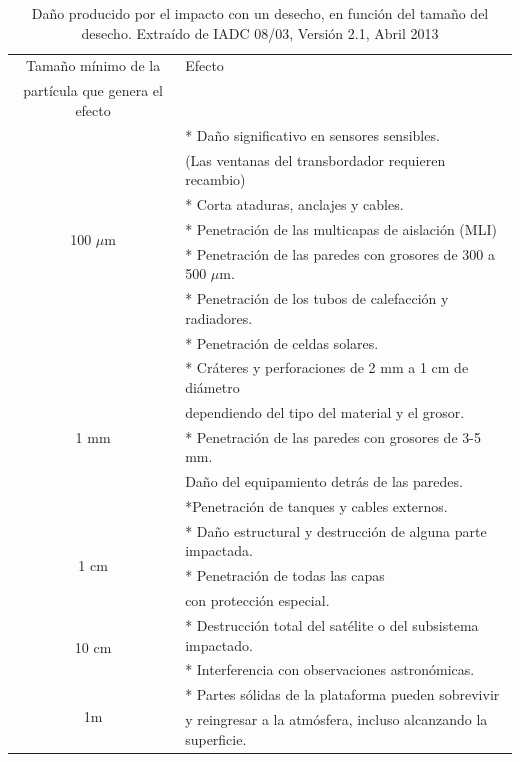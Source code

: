  \begin{table}[h]
\centering
\begin{tabular}[c]{|c l|}
\hline
\hline
Tama\~no m\'inimo de la  &    Efecto\\
part\'icula que genera el efecto & \\
\hline
\hline
\multirow{ 7}{*}{100 $\mu$m }& * Da\~no significativo en sensores sensibles.\\
& (Las ventanas del transbordador requieren recambio)\\
& * Corta ataduras, anclajes y cables.\\
& * Penetraci\'on de las multicapas de aislaci\'on (MLI)\\
& * Penetraci\'on de las paredes con grosores de 300 a 500 $\mu$m.\\
& * Penetraci\'on de los tubos de calefacci\'on y radiadores.\\
& * Penetraci\'on de celdas solares.\\
\hline 
\multirow{ 5}{*}{1 mm }& * Cr\'ateres y perforaciones de 2 mm a 1 cm de di\'ametro\\
& dependiendo del tipo del material y el grosor.\\
& * Penetraci\'on de las paredes con grosores de 3-5 mm.\\
& Da\~no del equipamiento detr\'as de las paredes.\\
& *Penetraci\'on de tanques y cables externos.\\
\hline
\multirow{ 3}{*}{1 cm } & * Da\~no estructural y destrucci\'on de alguna parte impactada.\\
& * Penetraci\'on de todas las capas\\ %
& con protecci\'on especial.\\
\hline
\multirow{ 2}{*}{10 cm } & * Destrucci\'on total del sat\'elite o del subsistema impactado.\\
& * Interferencia con observaciones astron\'omicas.\\
\hline
\multirow{ 2}{*}{1m}& * Partes s\'olidas de la plataforma pueden sobrevivir\\
& y reingresar a la atmósfera, incluso alcanzando la superficie.\\
\hline
\end{tabular}
\caption[Da\~no seg\'un el tama\~no del desecho.]{Da\~no producido por el impacto con un desecho, en funci\'on del tama\~no del desecho. Extra\'ido de IADC 08/03, Versi\'on 2.1, Abril 2013}
\label{tamanioDanio}
\end{table}

